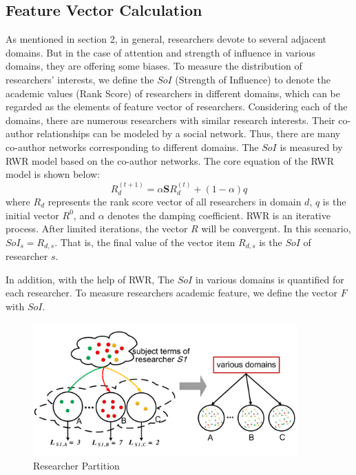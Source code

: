 \documentclass[review]{elsarticle}
\begin{document}
\subsection{Feature Vector Calculation}
As mentioned in section 2, in general, researchers devote to several adjacent domains. But in the case of attention and strength of influence in various domains, they are offering some biases. To measure the distribution of researchers' interests, we define the $SoI$ (Strength of Influence) to denote the academic values (Rank Score) of researchers in different domains, which can be regarded as the elements of feature vector of researchers. Considering each of the domains, there are numerous researchers with similar research interests. Their co-author relationships can be modeled by a social network. Thus, there are many co-author networks corresponding to different domains. The $SoI$ is measured by RWR model based on the co-author networks. The core equation of the RWR model is shown below:
\begin{equation}
R_{d}^{(t+1)}=\alpha \mathbf{S}R_{d}^{(t)}+(1-\alpha)q
\end{equation}
where $R_{d}$ represents the rank score vector of all researchers in domain $d$, $q$ is the initial vector $R^0$, and $\alpha$ denotes the damping coefficient. RWR is an iterative process. After limited iterations, the vector $R$ will be convergent. In this scenario, $SoI_{s}=R_{d,s}$. That is, the final value of the vector item $R_{d,s}$ is the $SoI$ of researcher $s$.


In addition, with the help of RWR, The $SoI$ in various domains is quantified for each researcher. To measure researchers academic feature, we define the vector $F$ with $SoI$.

\begin{figure}
\centering
\includegraphics [width=4in]{Fig5.pdf}
\caption{Researcher Partition}
\end{figure}
\end{document}
